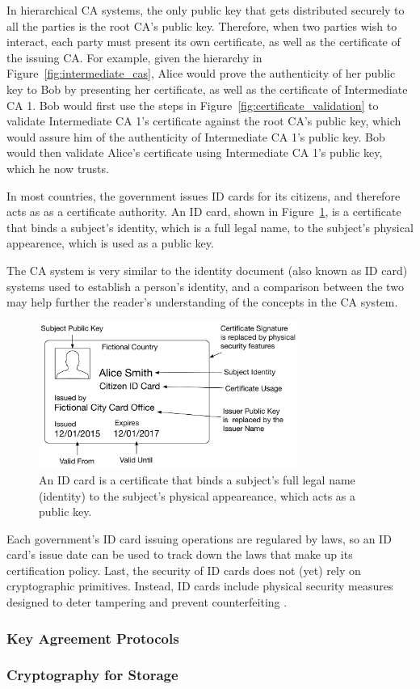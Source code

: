 In hierarchical CA systems, the only public key that gets distributed securely
to all the parties is the root CA's public key. Therefore, when two parties
wish to interact, each party must present its own certificate, as well as the
certificate of the issuing CA. For example, given the hierarchy in
Figure~\ref{fig:intermediate_cas}, Alice would prove the authenticity of her
public key to Bob by presenting her certificate, as well as the certificate of
Intermediate CA 1. Bob would first use the steps in
Figure~\ref{fig:certificate_validation} to validate Intermediate CA 1's
certificate against the root CA's public key, which would assure him of the
authenticity of Intermediate CA 1's public key. Bob would then validate Alice's
certificate using Intermediate CA 1's public key, which he now trusts.

In most countries, the government issues ID cards for its citizens, and
therefore acts as as a certificate authority. An ID card, shown in
Figure~\ref{fig:id_card_as_certificate}, is a certificate that binds a
subject's identity, which is a full legal name, to the subject's physical
appearence, which is used as a public key.

The CA system is very similar to the identity document (also known as ID card)
systems used to establish a person's identity, and a comparison between the two
may help further the reader's understanding of the concepts in the CA system.

\begin{figure}[hbt]
  \centering
  \includegraphics[width=85mm]{figures/id_card_as_certificate.pdf}
  \caption{
    An ID card is a certificate that binds a subject's full legal name
    (identity) to the subject's physical appeareance, which acts as a public
    key.
  }
  \label{fig:id_card_as_certificate}
\end{figure}

Each government's ID card issuing operations are regulared by laws, so an ID
card's issue date can be used to track down the laws that make up its
certification policy. Last, the security of ID cards does not (yet) rely on
cryptographic primitives. Instead, ID cards include physical security measures
designed to deter tampering and prevent counterfeiting .


\subsubsection{Key Agreement Protocols}

\subsubsection{Cryptography for Storage}
